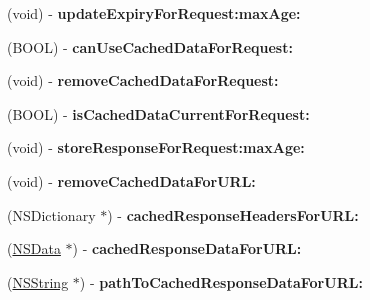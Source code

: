 \begin{DoxyCompactItemize}
\item 
\hypertarget{protocol_a_s_i_cache_delegate-p_ad793f424847f6f7a2c5154fb8cec1bb6}{
(void) -\/ {\bfseries update\-Expiry\-For\-Request\-:max\-Age\-:}}
\label{protocol_a_s_i_cache_delegate-p_ad793f424847f6f7a2c5154fb8cec1bb6}

\item 
\hypertarget{protocol_a_s_i_cache_delegate-p_a7cf0deb09983a6b552fd7a2130529c95}{
(\-B\-O\-O\-L) -\/ {\bfseries can\-Use\-Cached\-Data\-For\-Request\-:}}
\label{protocol_a_s_i_cache_delegate-p_a7cf0deb09983a6b552fd7a2130529c95}

\item 
\hypertarget{protocol_a_s_i_cache_delegate-p_a2e34141ed1db825ca2d1c292b068193e}{
(void) -\/ {\bfseries remove\-Cached\-Data\-For\-Request\-:}}
\label{protocol_a_s_i_cache_delegate-p_a2e34141ed1db825ca2d1c292b068193e}

\item 
\hypertarget{protocol_a_s_i_cache_delegate-p_a67c31b3473af7adba4cd548045935ac2}{
(\-B\-O\-O\-L) -\/ {\bfseries is\-Cached\-Data\-Current\-For\-Request\-:}}
\label{protocol_a_s_i_cache_delegate-p_a67c31b3473af7adba4cd548045935ac2}

\item 
\hypertarget{protocol_a_s_i_cache_delegate-p_ae7cfacf47d3d24e151530c033f993734}{
(void) -\/ {\bfseries store\-Response\-For\-Request\-:max\-Age\-:}}
\label{protocol_a_s_i_cache_delegate-p_ae7cfacf47d3d24e151530c033f993734}

\item 
\hypertarget{protocol_a_s_i_cache_delegate-p_aa2d162430d8c9bc47057030b3e305f18}{
(void) -\/ {\bfseries remove\-Cached\-Data\-For\-U\-R\-L\-:}}
\label{protocol_a_s_i_cache_delegate-p_aa2d162430d8c9bc47057030b3e305f18}

\item 
\hypertarget{protocol_a_s_i_cache_delegate-p_ab7b267fc153dcf624c91e2d07513f868}{
(\-N\-S\-Dictionary $\ast$) -\/ {\bfseries cached\-Response\-Headers\-For\-U\-R\-L\-:}}
\label{protocol_a_s_i_cache_delegate-p_ab7b267fc153dcf624c91e2d07513f868}

\item 
\hypertarget{protocol_a_s_i_cache_delegate-p_a24c0d2a6834e5a0332f3d95198fc681c}{
(\hyperlink{class_n_s_data}{\-N\-S\-Data} $\ast$) -\/ {\bfseries cached\-Response\-Data\-For\-U\-R\-L\-:}}
\label{protocol_a_s_i_cache_delegate-p_a24c0d2a6834e5a0332f3d95198fc681c}

\item 
\hypertarget{protocol_a_s_i_cache_delegate-p_a692463be3a5c9abe5a239eb761431799}{
(\hyperlink{class_n_s_string}{\-N\-S\-String} $\ast$) -\/ {\bfseries path\-To\-Cached\-Response\-Data\-For\-U\-R\-L\-:}}
\label{protocol_a_s_i_cache_delegate-p_a692463be3a5c9abe5a239eb761431799}


\end{DoxyCompactItemize}
